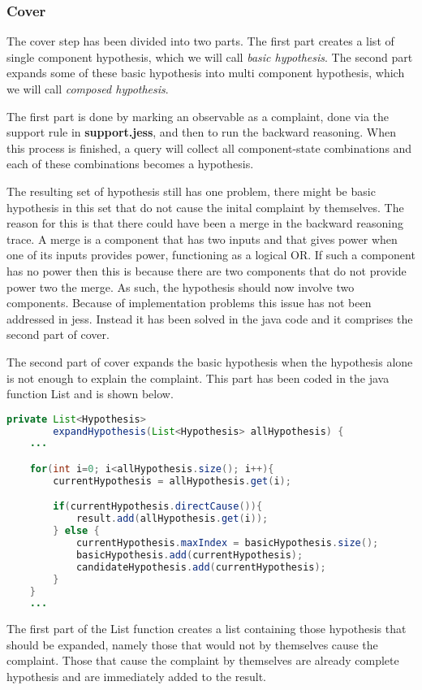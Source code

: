 \subsubsection{Cover}
The cover step has been divided into two parts. The first part creates a list of single component hypothesis, which we will call \emph{basic hypothesis}. The second part expands some of these basic hypothesis into multi component hypothesis, which we will call \emph{composed hypothesis}.

The first part is done by marking an observable as a complaint, done via the support rule in \textbf{support.jess}, and then to run the backward reasoning.  When this process is finished, a query will collect all component-state combinations and each of these combinations becomes a hypothesis.

The resulting set of hypothesis still has one problem, there might be basic hypothesis in this set that do not cause the inital complaint by themselves. The reason for this is that there could have been a merge in the backward reasoning trace. A merge is a component that has two inputs and that gives power when one of its inputs provides power, functioning as a logical OR. If such a component has no power then this is because there are two components that do not provide power two the merge. As such, the hypothesis should now involve two components. Because of implementation problems this issue has not been addressed in jess. Instead it has been solved in the java code and it comprises the second part of cover.

The second part of cover expands the basic hypothesis when the hypothesis alone is not enough to explain the complaint. This part has been coded in the java function List and is shown below.

\begin{lstlisting}[language=Java]
private List<Hypothesis>
        expandHypothesis(List<Hypothesis> allHypothesis) {
    ...

    for(int i=0; i<allHypothesis.size(); i++){
        currentHypothesis = allHypothesis.get(i);

        if(currentHypothesis.directCause()){
            result.add(allHypothesis.get(i));
        } else {
            currentHypothesis.maxIndex = basicHypothesis.size();
            basicHypothesis.add(currentHypothesis);
            candidateHypothesis.add(currentHypothesis); 
        }
    }
    ...
\end{lstlisting}

The first part of the List function creates a list containing those hypothesis that should be expanded, namely those that would not by themselves cause the complaint. Those that cause the complaint by themselves are already complete hypothesis and are immediately added to the result. 

